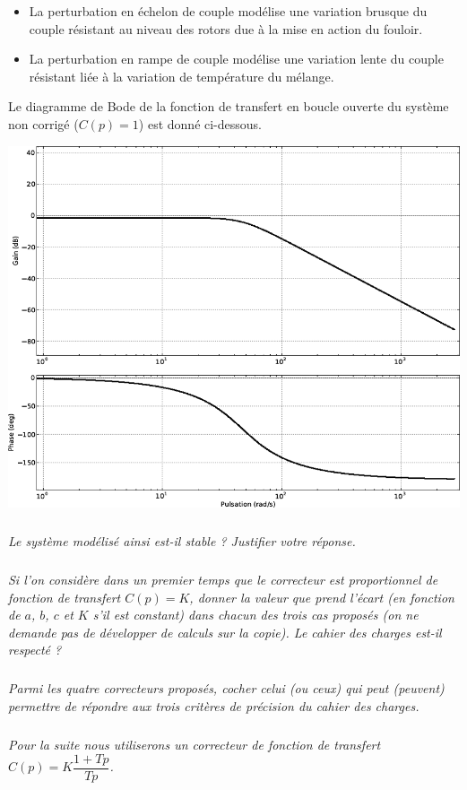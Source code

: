 \documentclass[10pt,fleqn]{article} %
\begin{document}
\begin{rem}
\begin{itemize}
\item La perturbation en échelon de couple modélise une variation brusque du couple résistant au niveau des rotors due à la mise en action du fouloir.
\item La perturbation en rampe de couple modélise une variation lente du couple résistant liée à la variation de température du mélange.
\end{itemize}
\end{rem}

Le diagramme de Bode de la fonction de transfert en boucle ouverte du système non corrigé ($C(p) = 1$) est donné ci-dessous.

\begin{center}
\includegraphics[width=.8\linewidth]{images/e3a_08.png}
\end{center}


\subparagraph{}
\textit{Le système modélisé ainsi est-il stable ? Justifier votre réponse.}

\subparagraph{}
\textit{Si l'on considère dans un premier temps que le correcteur est proportionnel de fonction de transfert $C(p) = K$, donner la valeur que prend l'écart (en fonction de $a$, $b$, $c$ et $K$ s’il est constant) dans chacun des trois cas proposés (on ne demande pas de développer de calculs sur la copie). Le cahier des charges est-il respecté ?}

\subparagraph{}
\textit{Parmi les quatre correcteurs proposés, cocher celui (ou ceux) qui peut (peuvent) permettre de répondre aux trois critères de précision du cahier des charges.}

\subparagraph{}
\textit{Pour la suite nous utiliserons un correcteur de fonction de transfert  $C(p)=K\dfrac{1+Tp}{Tp}$.}
\end{document}
